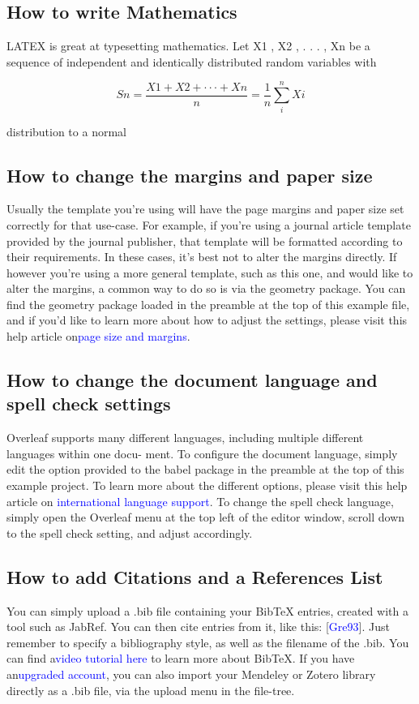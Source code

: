 \documentclass{article}
\begin{document}
\subsection{How to write Mathematics}
LATEX is great at typesetting mathematics. Let X1 , X2 , . . . , Xn be a sequence of independent and
identically distributed random variables with

\begin{equation}
	Sn=\frac{X1 + X2 + · · · + Xn}{n}=\frac{1}{n}\sum_{i}^{n} Xi
\end{equation}

distribution to a normal 
\subsection{How to change the margins and paper size}
Usually the template you’re using will have the page margins and paper size set correctly for that
use-case. For example, if you’re using a journal article template provided by the journal publisher,
that template will be formatted according to their requirements. In these cases, it’s best not to alter
the margins directly.
If however you’re using a more general template, such as this one, and would like to alter the
margins, a common way to do so is via the geometry package. You can find the geometry package
loaded in the preamble at the top of this example file, and if you’d like to learn more about how to
adjust the settings, please visit this help article on\textcolor{blue}{page size and margins}.
\subsection{How to change the document language and spell check settings}
Overleaf supports many different languages, including multiple different languages within one docu-
ment.
To configure the document language, simply edit the option provided to the babel package in the
preamble at the top of this example project. To learn more about the different options, please visit
this help article on \textcolor{blue}{international language support}.
To change the spell check language, simply open the Overleaf menu at the top left of the editor
window, scroll down to the spell check setting, and adjust accordingly.
\subsection{How to add Citations and a References List}
You can simply upload a .bib file containing your BibTeX entries, created with a tool such as JabRef.
You can then cite entries from it, like this: [\textcolor{blue}{Gre93}]. Just remember to specify a bibliography style, as
well as the filename of the .bib. You can find a\textcolor{blue}{video tutorial here} to learn more about BibTeX.
If you have an\textcolor{blue}{upgraded account}, you can also import your Mendeley or Zotero library directly as
a .bib file, via the upload menu in the file-tree.
\end{document}
